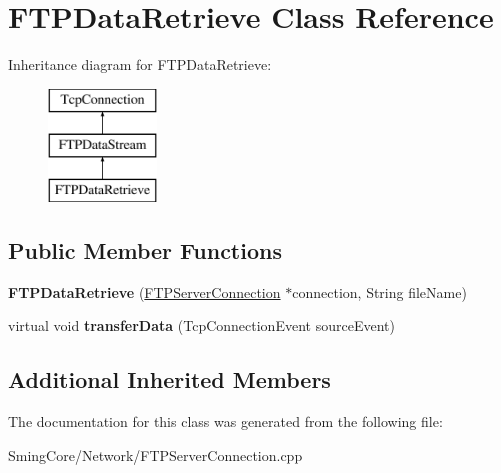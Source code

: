 \hypertarget{class_f_t_p_data_retrieve}{}\section{F\+T\+P\+Data\+Retrieve Class Reference}
\label{class_f_t_p_data_retrieve}
Inheritance diagram for F\+T\+P\+Data\+Retrieve\+:\begin{figure}[H]
\begin{center}
\leavevmode
\includegraphics[height=3.000000cm]{class_f_t_p_data_retrieve}
\end{center}
\end{figure}
\subsection*{Public Member Functions}
\begin{DoxyCompactItemize}
\item 
\hypertarget{class_f_t_p_data_retrieve_a9d886ba51a823e38b1bb7b68ef53b93b}{}{\bfseries F\+T\+P\+Data\+Retrieve} (\hyperlink{class_f_t_p_server_connection}{F\+T\+P\+Server\+Connection} $\ast$connection, String file\+Name)\label{class_f_t_p_data_retrieve_a9d886ba51a823e38b1bb7b68ef53b93b}

\item 
\hypertarget{class_f_t_p_data_retrieve_a6dfb5d32a7ef8a463f0a650ae04154f9}{}virtual void {\bfseries transfer\+Data} (Tcp\+Connection\+Event source\+Event)\label{class_f_t_p_data_retrieve_a6dfb5d32a7ef8a463f0a650ae04154f9}

\end{DoxyCompactItemize}
\subsection*{Additional Inherited Members}


The documentation for this class was generated from the following file\+:\begin{DoxyCompactItemize}
\item 
Sming\+Core/\+Network/F\+T\+P\+Server\+Connection.\+cpp\end{DoxyCompactItemize}

